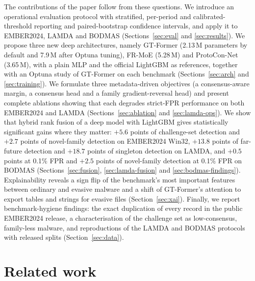 \documentclass[fleqn,10pt]{wlscirep}
\newcommand{\gtf}{GT\mbox{-}Former}
\newcommand{\lgbm}{LightGBM}
\begin{document}
The contributions of the paper follow from these questions. We introduce an operational evaluation protocol with stratified, per-period and calibrated-threshold reporting and paired-bootstrap confidence intervals, and apply it to EMBER2024, LAMDA and BODMAS (Sections~\ref{sec:eval} and \ref{sec:results}). We propose three new deep architectures, namely \gtf{} (2.13\,M parameters by default and 7.9\,M after Optuna tuning), FR-MoE (5.28\,M) and ProtoCon-Net (3.65\,M), with a plain MLP and the official \lgbm{} as references, together with an Optuna study of \gtf{} on each benchmark (Sections~\ref{sec:arch} and \ref{sec:training}). We formulate three metadata-driven objectives (a consensus-aware margin, a consensus head and a family gradient-reversal head) and present complete ablations showing that each degrades strict-FPR performance on both EMBER2024 and LAMDA (Sections~\ref{sec:ablation} and \ref{sec:lamda-ops}). We show that hybrid rank fusion of a deep model with \lgbm{} gives statistically significant gains where they matter: $+5.6$ points of challenge-set detection and $+2.7$ points of novel-family detection on EMBER2024 Win32, $+13.8$ points of far-future detection and $+18.7$ points of singleton detection on LAMDA, and $+0.5$ points at 0.1\% FPR and $+2.5$ points of novel-family detection at 0.1\% FPR on BODMAS (Sections~\ref{sec:fusion}, \ref{sec:lamda-fusion} and \ref{sec:bodmas-findings}). Explainability reveals a sign flip of the benchmark's most important features between ordinary and evasive malware and a shift of \gtf{}'s attention to export tables and strings for evasive files (Section~\ref{sec:xai}). Finally, we report benchmark-hygiene findings: the exact duplication of every record in the public EMBER2024 release, a characterisation of the challenge set as low-consensus, family-less malware, and reproductions of the LAMDA and BODMAS protocols with released splits (Section~\ref{sec:data}).

\section{Related work}
\label{sec:related}
\end{document}
